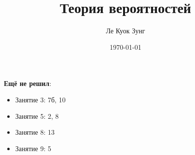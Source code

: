 \documentclass{article}
\title{Теория вероятностей}
\author{Ле Куок Зунг}
\date{\today}
\theoremstyle{definition}
\begin{document}
	\maketitle
	
	\newpage
	
	\newpage
	
	\newpage
	
	\newpage
	
	\newpage
	
	\newpage
	
	\newpage
	
	\newpage
	\textbf{Ещё не решил}:
	\begin{itemize}
		\item Занятие 3: 7б, 10
		\item Занятие 5: 2, 8
		\item Занятие 8: 13
		\item Занятие 9: 5
	\end{itemize}
	\newpage
	
\end{document}
